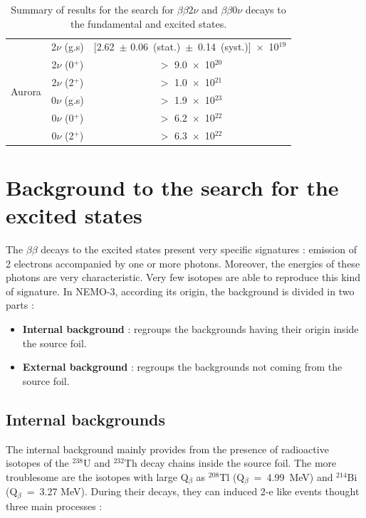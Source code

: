 \documentclass[main.tex]{subfiles}
\begin{document}
\begin{table}[h!]
\begin{center}
\begin{tabular}{c|c|c}
\multirow{6}{*}{Aurora} & 2$\nu$ (g.s) & [2.62~$\pm$ 0.06~(stat.)~$\pm$~0.14~(syst.)]~$\times$~10$^{\text{19}}$\\[0.1cm]
                        & 2$\nu$ (0$^+$) & $>$ 9.0~$\times$~10$^{\text{20}}$\\[0.1cm]
                        & 2$\nu$ (2$^+$) & $>$ 1.0~$\times$~10$^{\text{21}}$\\[0.1cm]
                        & 0$\nu$ (g.s)   & $>$ 1.9~$\times$~10$^{\text{23}}$\\[0.1cm]
                        & 0$\nu$ (0$^+$) & $>$ 6.2~$\times$~10$^{\text{22}}$\\[0.1cm]
                        & 0$\nu$ (2$^+$) & $>$ 6.3~$\times$~10$^{\text{22}}$\\[0.1cm]
\bottomrule
\end{tabular}
\caption{Summary of results for the search for $\beta \beta 2\nu$ and $\beta \beta 0\nu$ decays to the fundamental and excited states.}
\label{TableSummaryResultsFS}
\end{center}
\end{table}


\FloatBarrier



\section{Background to the search for the excited states}


\NI The $\beta \beta$ decays to the excited states present very specific signatures : emission of  2 electrons accompanied by one or more photons. Moreover, the energies of these photons are very characteristic. Very few isotopes are able to reproduce this kind of signature. In NEMO-3, according its origin, the background is divided in two parts : 


\begin{itemize}
\item \textbf{Internal background} : regroups the backgrounds having their origin inside the source foil.
\item \textbf{External background} : regroups the backgrounds not coming from the source foil.
\end{itemize}


\subsection{Internal backgrounds}


\NI The internal background mainly provides from the presence of radioactive isotopes of the $^{\text{238}}$U and $^{\text{232}}$Th decay chains inside the source foil. The more troublesome are the isotopes with large Q$_\beta$ as $^{\text{208}}$Tl (Q$_\beta$~=~4.99~MeV) and $^{\text{214}}$Bi (Q$_{\beta}$~=~3.27 MeV). During their decays, they can induced 2-e like events thought three main processes :
\end{document}
